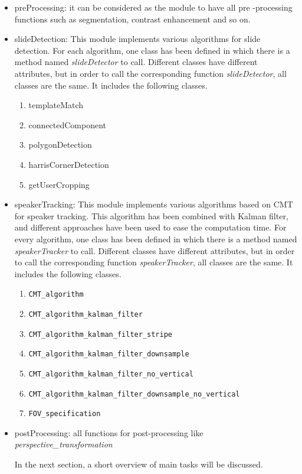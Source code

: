 \documentclass[[12pt,DIV14,BCOR12mm,a4paper,footexclude,headinclude,halfparskip-,twoside,openright,cleardoubleempty,idxtotoc,bibtotoc]{article}
\begin{document}
\begin{itemize}
\item preProcessing: it can be considered as the module to have all pre -processing functions such as segmentation, contrast enhancement and so on.

\item slideDetection: This module implements various algorithms for slide detection. For each algorithm, 
one class has been defined in which there is a method named \textit{slideDetector} to call.
Different classes have different attributes, but in order to call the corresponding function \textit{slideDetector}, all classes are the same. It includes the following classes.

\begin{enumerate}
\item templateMatch
\item connectedComponent
\item polygonDetection
\item harrisCornerDetection
\item getUserCropping
\end{enumerate}

\item speakerTracking: This module implements various algorithms based on CMT for speaker tracking. 
This algorithm has been combined with Kalman filter, and 
different approaches have been used to ease the computation time.
 For every algorithm, one class has been defined in which there is a method named \textit{speakerTracker} to call.
Different classes have different attributes, but in order to call the corresponding
function \textit{speakerTracker}, all classes are the same. It includes the following classes.

\begin{enumerate}
\item \texttt{CMT\_algorithm}
\item \texttt{CMT\_algorithm\_kalman\_filter}
\item \texttt{CMT\_algorithm\_kalman\_filter\_stripe}
\item \texttt{CMT\_algorithm\_kalman\_filter\_downsample}
\item \texttt{CMT\_algorithm\_kalman\_filter\_no\_vertical}
\item \texttt{CMT\_algorithm\_kalman\_filter\_downsample\_no\_vertical}
\item \texttt{FOV\_specification}
\end{enumerate}

\item postProcessing: all functions for post-processing like \textit{perspective\_transformation}

In the next section, a short overview of main tasks will be discussed.

\end{itemize}
\end{document}
